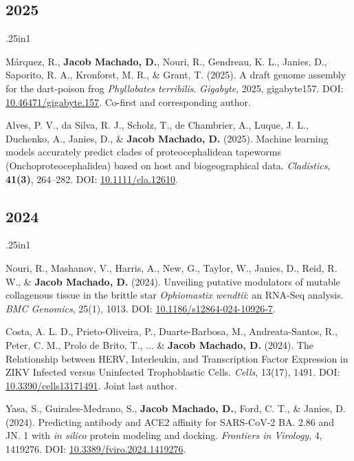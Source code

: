 \documentclass[11pt, letterpaper, sans]{moderncv}
\begin{document}
\subsection{2025}

	{\setlength{\parskip}{.5em}\renewcommand{\baselinestretch}{2.0}\begin{hangparas}{.25in}{1}

        Márquez, R., \textbf{Jacob Machado, D.}, Nouri, R., Gendreau, K. L., Janies, D., Saporito, R. A., Kronforst, M. R., \& Grant, T. (2025). A draft genome assembly for the dart-poison frog \textit{Phyllobates terribilis}. \textit{Gigabyte}, 2025, gigabyte157. DOI: \href{https://doi.org/10.46471/gigabyte.157}{10.46471/gigabyte.157}. Co-first and corresponding author.

		Alves, P. V., da Silva, R. J., Scholz, T., de Chambrier, A., Luque, J. L., Duchenko, A., Janies, D., \& \textbf{Jacob Machado, D.} (2025). Machine learning models accurately predict clades of proteocephalidean tapeworms (Onchoproteocephalidea) based on host and biogeographical data. \textit{Cladistics}, \textbf{41(3)}, 264--282. DOI: \href{https://doi.org/10.1111/cla.12610}{10.1111/cla.12610}.

	\end{hangparas}}


\subsection{2024}

	{\setlength{\parskip}{.5em}\renewcommand{\baselinestretch}{2.0}\begin{hangparas}{.25in}{1}

		Nouri, R., Mashanov, V., Harris, A., New, G., Taylor, W., Janies, D., Reid, R. W., \& \textbf{Jacob Machado, D.} (2024). Unveiling putative modulators of mutable collagenous tissue in the brittle star \textit{Ophiomastix wendtii}: an RNA-Seq analysis. \textit{BMC Genomics}, 25(1), 1013. DOI: \href{https://doi.org/10.1186/s12864-024-10926-7}{10.1186/s12864-024-10926-7}.

		Costa, A. L. D., Prieto-Oliveira, P., Duarte-Barbosa, M., Andreata-Santos, R., Peter, C. M., Prolo de Brito, T., ... \& \textbf{Jacob Machado, D.} (2024). The Relationship between HERV, Interleukin, and Transcription Factor Expression in ZIKV Infected versus Uninfected Trophoblastic Cells. \textit{Cells}, 13(17), 1491. DOI: \href{https://doi.org/10.3390/cells13171491}{10.3390/cells13171491}. Joint last author.

        Yasa, S., Guirales-Medrano, S., \textbf{Jacob Machado, D.}, Ford, C. T., \& Janies, D. (2024). Predicting antibody and ACE2 affinity for SARS-CoV-2 BA. 2.86 and JN. 1 with \textit{in silico} protein modeling and docking. \textit{Frontiers in Virology}, 4, 1419276. DOI: \href{https://doi.org/10.3389/fviro.2024.1419276}{10.3389/fviro.2024.1419276}.

	\end{hangparas}}
\end{document}
